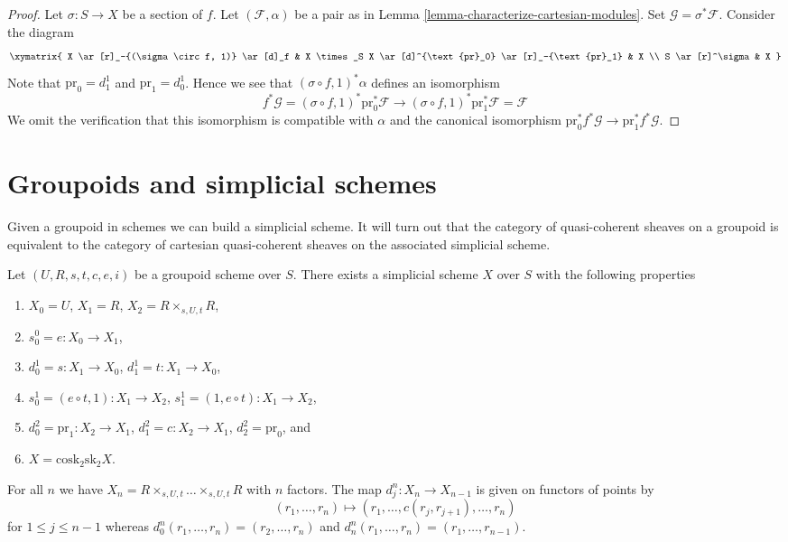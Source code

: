\begin{proof}
Let $\sigma : S \to X$ be a section of $f$. Let $(\mathcal{F}, \alpha)$
be a pair as in Lemma \ref{lemma-characterize-cartesian-modules}.
Set $\mathcal{G} = \sigma^*\mathcal{F}$. Consider the diagram
$$
\xymatrix{
X \ar[r]_-{(\sigma \circ f, 1)} \ar[d]_f &
X \times_S X \ar[d]^{\text{pr}_0} \ar[r]_-{\text{pr}_1} & X \\
S \ar[r]^\sigma & X
}
$$
Note that $\text{pr}_0 = d^1_1$ and $\text{pr}_1 = d^1_0$. Hence we
see that $(\sigma \circ f, 1)^*\alpha$ defines an isomorphism
$$
f^*\mathcal{G} = (\sigma \circ f, 1)^*\text{pr}_0^*\mathcal{F}
\longrightarrow
(\sigma \circ f, 1)^*\text{pr}_1^*\mathcal{F} = \mathcal{F}
$$
We omit the verification that this isomorphism is compatible
with $\alpha$ and the canonical isomorphism
$\text{pr}_0^*f^*\mathcal{G} \to \text{pr}_1^*f^*\mathcal{G}$.
\end{proof}






\section{Groupoids and simplicial schemes}
\label{section-groupoids-simplicial}

\noindent
Given a groupoid in schemes we can build a simplicial scheme.
It will turn out that the category of quasi-coherent sheaves on a
groupoid is equivalent to the category of cartesian quasi-coherent
sheaves on the associated simplicial scheme.

\begin{lemma}
\label{lemma-groupoid-simplicial}
Let $(U, R, s, t, c, e, i)$ be a groupoid scheme over $S$.
There exists a simplicial scheme $X$ over $S$
with the following properties
\begin{enumerate}
\item $X_0 = U$, $X_1 = R$, $X_2 = R \times_{s, U, t} R$,
\item $s_0^0 = e : X_0 \to X_1$,
\item $d^1_0 = s : X_1 \to X_0$, $d^1_1 = t : X_1 \to X_0$,
\item $s_0^1 = (e \circ t, 1) : X_1 \to X_2$,
$s_1^1 = (1, e \circ t) : X_1 \to X_2$,
\item $d^2_0 = \text{pr}_1 : X_2 \to X_1$,
$d^2_1 = c : X_2 \to X_1$,
$d^2_2 = \text{pr}_0$, and
\item $X = \text{cosk}_2 \text{sk}_2 X$.
\end{enumerate}
For all $n$ we have $X_n = R \times_{s, U, t} \ldots \times_{s, U, t} R$
with $n$ factors. The map $d^n_j : X_n \to X_{n - 1}$ is given on
functors of points by
$$
(r_1, \ldots, r_n) \longmapsto (r_1, \ldots, c(r_j, r_{j + 1}), \ldots, r_n)
$$
for $1 \leq j \leq n - 1$ whereas
$d^n_0(r_1, \ldots, r_n) = (r_2, \ldots, r_n)$ and
$d^n_n(r_1, \ldots, r_n) = (r_1, \ldots, r_{n - 1})$.
\end{lemma}

